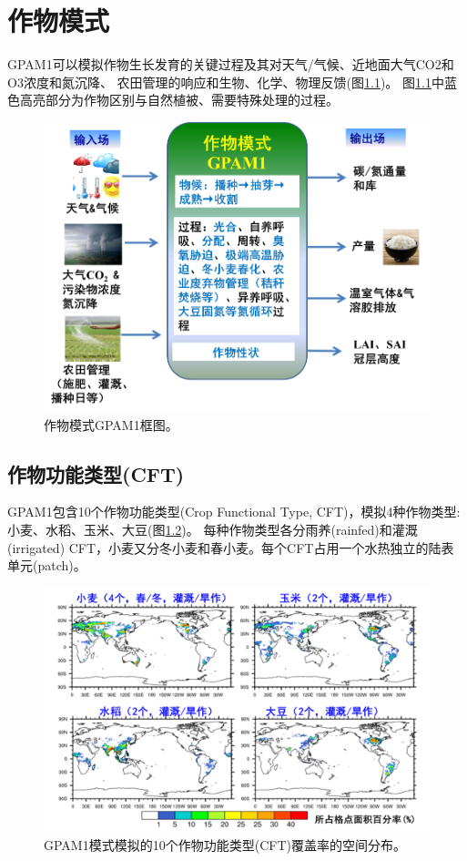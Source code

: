 \chapter{作物模式}

GPAM1可以模拟作物生长发育的关键过程及其对天气/气候、近地面大气CO2和O3浓度和氮沉降、
农田管理的响应和生物、化学、物理反馈(图\ref{fig:作物模式GPAM1框图})。
图\ref{fig:作物模式GPAM1框图}中蓝色高亮部分为作物区别与自然植被、需要特殊处理的过程。
{
\begin{figure}[]
\centering
\includegraphics{Figures/作物模式/作物模式GPAM1框图.png}
\caption{作物模式GPAM1框图。  }
\label{fig:作物模式GPAM1框图}
\end{figure}
}
\section{作物功能类型(CFT)}
GPAM1包含10个作物功能类型(Crop Functional Type, CFT)，模拟4种作物类型: 小麦、水稻、玉米、大豆(图\ref{fig:作物功能类型覆盖率的空间分布})。
每种作物类型各分雨养(rainfed)和灌溉(irrigated) CFT，小麦又分冬小麦和春小麦。每个CFT占用一个水热独立的陆表单元(patch)。
{
\begin{figure}[]
\centering
\includegraphics{Figures/作物模式/作物功能类型覆盖率的空间分布.png}
\caption{GPAM1模式模拟的10个作物功能类型(CFT)覆盖率的空间分布。}
\label{fig:作物功能类型覆盖率的空间分布}
\end{figure}
}
